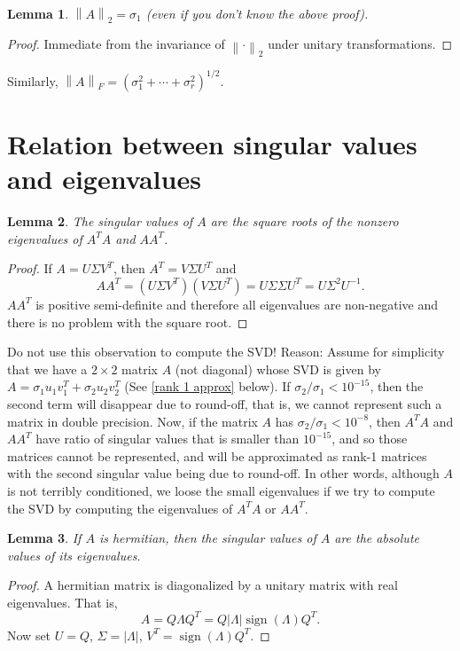 \documentclass{article}
\newtheorem{lemma}{Lemma}[section]
\newcommand{\norm}[1]{\left \lVert #1 \right \rVert}
\newcommand{\abs}[1]{\lvert #1 \rvert}
\begin{document}
\begin{lemma}
$\norm{A}_{2} = \sigma_{1}$ (even if you don't know the above
proof).
\end{lemma}
\begin{proof}
Immediate from the invariance of $\norm{\cdot}_{2}$ under unitary
transformations.
\end{proof}
Similarly, $\norm{A}_{F} = (\sigma_{1}^{2} + \cdots +
\sigma_{r}^{2})^{1/2}$.

\section{Relation between singular values and eigenvalues}
\begin{lemma}
The singular values of $A$ are the square roots of the nonzero
eigenvalues of $A^{T}A$ and $AA^{T}$.
\end{lemma}
\begin{proof}
If $A=U \Sigma V^{T}$, then $A^{T}=V \Sigma U^{T}$ and
\begin{equation*}
AA^{T} = \left (  U \Sigma V^{T} \right ) \left ( V \Sigma U^{T}
\right ) = U \Sigma \Sigma U^{T} = U \Sigma^{2} U^{-1}.
\end{equation*}
$AA^{T}$ is positive semi-definite and therefore all eigenvalues are
non-negative and there is no problem with the square root.
\end{proof}

Do not use this observation to compute the SVD! Reason: Assume for
simplicity that we have a $2 \times 2$ matrix $A$ (not diagonal)
whose SVD is given by $A = \sigma_{1} u_{1} v_{1}^{T} + \sigma_{2}
u_{2} v_{2}^{T}$ (See \ref{rank 1 approx} below). If
$\sigma_{2}/\sigma_{1} < 10^{-15}$, then the second term will
disappear due to round-off, that is, we cannot represent such a
matrix in double precision. Now, if the matrix $A$ has
$\sigma_{2}/\sigma_{1} < 10^{-8}$, then $A^{T}A$ and $AA^{T}$ have
ratio of singular values that is smaller than $10^{-15}$, and so
those matrices cannot be represented, and will be approximated as
rank-1 matrices with the second singular value being due to
round-off. In other words, although $A$ is not terribly conditioned,
we loose the small eigenvalues if we try to compute the SVD by
computing the eigenvalues of $A^{T}A$ or $AA^{T}$.

\begin{lemma}
If $A$ is hermitian, then the singular values of $A$ are the
absolute values of its eigenvalues.
\end{lemma}
\begin{proof}
A hermitian matrix is diagonalized by a unitary matrix with real
eigenvalues. That is,
\begin{equation*}
A=Q \Lambda Q^{T} = Q \abs{\Lambda} \operatorname{sign}(\Lambda)
Q^{T}.
\end{equation*}
Now set $U=Q$, $\Sigma=\abs{\Lambda}$,
$V^{T}=\operatorname{sign}(\Lambda) Q^{T}$.
\end{proof}
\end{document}
